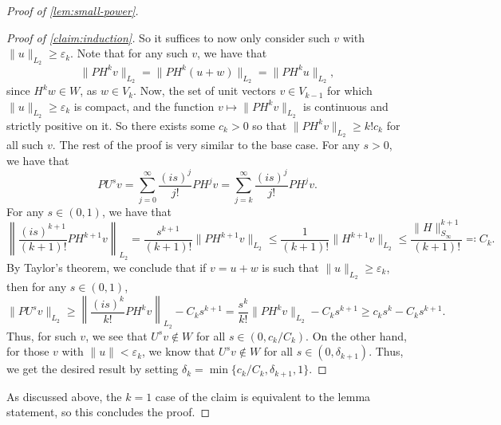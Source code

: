 \documentclass{toc}
\theoremstyle{plain}
\numberwithin{equation}{section}
\theoremstyle{definition}
\newcommand{\bnorm}[1]{\left\lVert#1\right\rVert}
\newcommand{\norm}[1]{\lVert#1\rVert}
\begin{document}
\begin{proof}[Proof of \cref{lem:small-power}]
\begin{proof}[Proof of \cref{claim:induction}]
        So it suffices to now only consider such $v$ with $\norm u_{L_2} \geq \varepsilon_k$. Note that for any such $v$, we have that 
        \[
            \norm{PH^k v}_{L_2} = \norm{PH^k (u+w)}_{L_2} = \norm{PH^k u}_{L_2},
        \]
        since $H^k w \in W$, as $w \in V_k$. Now, the set of unit vectors $v \in V_{k-1}$ for which $\norm u_{L_2} \geq \varepsilon_k$ is compact, and the function $v \mapsto \norm{PH^k v}_{L_2}$ is continuous and strictly positive on it. So there exists some $c_k>0$ so that $\norm{PH^k v}_{L_2} \geq k! c_k$ for all such $v$.
        The rest of the proof is very similar to the base case. For any $s>0$, we have that
        \[
            PU^sv = \sum_{j=0}^\infty \frac{(is)^j}{j!} PH^j v = \sum_{j=k}^\infty \frac{(is)^j}{j!} PH^j v.
        \]
        For any $s \in (0,1)$, we have that 
        \[
            \bnorm{\frac{(is)^{k+1}}{(k+1)!} PH^{k+1}v}_{L_2} = \frac{s^{k+1}}{(k+1)!} \norm{PH^{k+1}v}_{L_2} \leq \frac{1}{(k+1)!} \norm{H^{k+1}v}_{L_2} \leq \frac{\norm H_{S_\infty}^{k+1}}{(k+1)!}\eqqcolon C_k.
        \]
        By Taylor's theorem, we conclude that if $v=u+w$ is such that $\norm u_{L_2} \geq \varepsilon_k$, then for any $s \in (0,1)$,
        \[
            \norm{PU^s v}_{L_2} \geq \bnorm{\frac{(is)^k}{k!} PH^k v}_{L_2} - C_k s^{k+1} = \frac{s^k}{k!} \norm{PH^k v}_{L_2} - C_k s^{k+1} \geq c_k s^k - C_k s^{k+1}.
        \]
        Thus, for such $v$, we see that $U^s v \notin W$ for all $s \in (0, c_k/C_k)$. On the other hand, for those $v$ with $\norm u<\varepsilon_k$, we know that $U^s v \notin W$ for all $s \in (0,\delta_{k+1})$. Thus, we get the desired result by setting $\delta_k = \min\{c_k/C_k, \delta_{k+1},1\}$.
    \end{proof}
    As discussed above, the $k=1$ case of the claim is equivalent to the lemma statement, so this concludes the proof. 
\end{proof}
\end{document}
